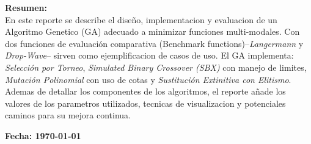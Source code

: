 \begin{titlepage}
\begin{center}
        \begin{minipage}{0.8\textwidth}
            \textbf{Resumen:}\\[0.3cm]
            En este reporte se describe el diseño, implementacion y evaluacion de un Algoritmo Genetico (GA) adecuado a minimizar funciones multi-modales. Con dos funciones de evaluación comparativa (Benchmark functions)--\textit{Langermann} y \textit{Drop-Wave}-- sirven como ejemplificacion de casos de uso. El GA implementa: \textit{Selección por Torneo}, \textit{Simulated Binary Crossover (SBX)} con manejo de limites, \textit{Mutación Polinomial} con uso de cotas y \textit{Sustitución Extinitiva con Elitismo}. Ademas de detallar los componentes de los algoritmos, el reporte añade los valores de los parametros utilizados, tecnicas de visualizacion y potenciales caminos para su mejora continua.
        \end{minipage}
        
        \vspace{0.3cm}

        \textbf{\large Fecha: \today}

    \end{center}
\end{titlepage}
